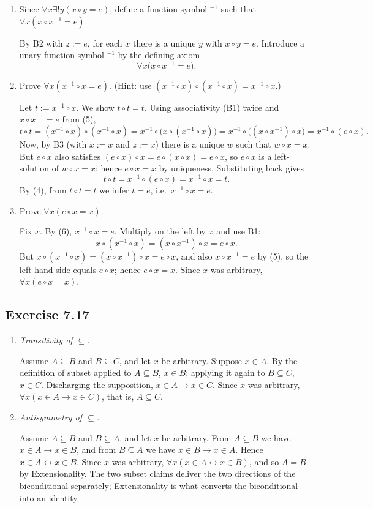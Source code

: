 \documentclass[12pt,fleqn]{article}
\newcommand{\exercise}[1]{%
  \subsection*{Exercise #1}%
  \addcontentsline{toc}{subsection}{Exercise #1}%
}
\begin{document}
\begin{enumerate}
\item Since $\forall x\exists!y(x\circ y=e)$, define a function symbol ${}^{-1}$
such that $\forall x(x\circ x^{-1}=e)$.

By B2 with $z:=e$, for each $x$ there is a unique $y$ with $x\circ y=e$.
Introduce a unary function symbol ${}^{-1}$ by the defining axiom
\[
\forall x\bigl(x\circ x^{-1}=e\bigr).
\]

\item Prove $\forall x(x^{-1}\circ x=e)$.
(Hint: use $(x^{-1}\circ x)\circ (x^{-1}\circ x)=x^{-1}\circ x$.)

Let $t:=x^{-1}\circ x$. We show $t\circ t=t$.
Using associativity (B1) twice and $x\circ x^{-1}=e$ from (5),
\[
t\circ t
= (x^{-1}\circ x)\circ (x^{-1}\circ x)
= x^{-1}\circ\bigl(x\circ (x^{-1}\circ x)\bigr)
= x^{-1}\circ\bigl((x\circ x^{-1})\circ x\bigr)
= x^{-1}\circ(e\circ x).
\]
Now, by B3 (with $x:=x$ and $z:=x$) there is a unique $w$ such that $w\circ x=x$.
But $e\circ x$ also satisfies $(e\circ x)\circ x = e\circ (x\circ x)=e\circ x$,
so $e\circ x$ is a left-solution of $w\circ x=x$; hence $e\circ x=x$ by uniqueness.
Substituting back gives
\[
t\circ t = x^{-1}\circ (e\circ x)=x^{-1}\circ x=t.
\]
By (4), from $t\circ t=t$ we infer $t=e$, i.e.\ $x^{-1}\circ x=e$.

\item Prove $\forall x(e\circ x=x)$.

Fix $x$. By (6), $x^{-1}\circ x=e$. Multiply on the left by $x$ and use B1:
\[
x\circ (x^{-1}\circ x) = (x\circ x^{-1})\circ x = e\circ x.
\]
But $x\circ (x^{-1}\circ x) = (x\circ x^{-1})\circ x = e\circ x$, and also
$x\circ x^{-1}=e$ by (5), so the left-hand side equals $e\circ x$; hence
$e\circ x = x$. Since $x$ was arbitrary, $\forall x(e\circ x=x)$.
\end{enumerate}



\exercise{7.17}

\begin{enumerate}

\item[\(2.\)] \emph{Transitivity of $\subseteq$.}

Assume $A\subseteq B$ and $B\subseteq C$, and let $x$ be arbitrary. Suppose
$x\in A$. By the definition of subset applied to $A\subseteq B$, $x\in B$;
applying it again to $B\subseteq C$, $x\in C$. Discharging the supposition,
$x\in A\to x\in C$. Since $x$ was arbitrary, $\forall x(x\in A\to x\in C)$,
that is, $A\subseteq C$.

\item[\(3.\)] \emph{Antisymmetry of $\subseteq$.}

Assume $A\subseteq B$ and $B\subseteq A$, and let $x$ be arbitrary. From
$A\subseteq B$ we have $x\in A\to x\in B$, and from $B\subseteq A$ we have
$x\in B\to x\in A$. Hence $x\in A\leftrightarrow x\in B$. Since $x$ was
arbitrary, $\forall x(x\in A\leftrightarrow x\in B)$, and so $A=B$ by
Extensionality. The two subset claims deliver the two directions of the
biconditional separately; Extensionality is what converts the biconditional
into an identity.

\end{enumerate}
\end{document}
